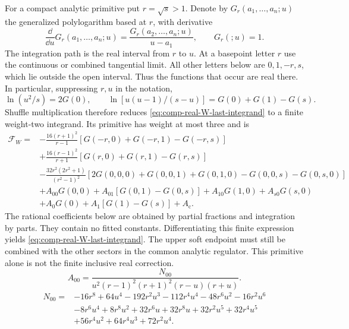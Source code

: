 For a compact analytic primitive put $r=\sqrt{s}>1$. Denote by
$G_r(a_1,\ldots,a_n;u)$ the generalized polylogarithm based at $r$,
with derivative
\begin{equation}
 \frac{\dd}{\dd u}G_r(a_1,\ldots,a_n;u)
 =\frac{G_r(a_2,\ldots,a_n;u)}{u-a_1},\qquad G_r(;u)=1.
\end{equation}
The integration path is the real interval from $r$ to $u$. At a
basepoint letter $r$ use the continuous or combined tangential
limit. All other letters below are $0,1,-r,s$, which lie outside
the open interval. Thus the functions that occur are real there.
In particular, suppressing $r,u$ in the notation,
\begin{equation}
 \ln(u^2/s)=2G(0),\qquad
 \ln[u(u-1)/(s-u)]=G(0)+G(1)-G(s).
\end{equation}
Shuffle multiplication therefore reduces
\eqref{eq:comp-real-W-last-integrand} to a finite weight-two
integrand. Its primitive has weight at most three and is
\begin{align}
 \mathcal F_W={}&-\frac{16(r+1)^2}{r-1}
       [G(-r,0)+G(-r,1)-G(-r,s)]\\
 &+\frac{16(r-1)^2}{r+1}
       [G(r,0)+G(r,1)-G(r,s)]\\
 &-\frac{32r^2(2r^2+1)}{(r^2-1)^2}
       [2G(0,0,0)+G(0,0,1)+G(0,1,0)-G(0,0,s)-G(0,s,0)]\\
 &+A_{00}G(0,0)+A_{01}[G(0,1)-G(0,s)]
        +A_{10}G(1,0)+A_{s0}G(s,0)\\
 &+A_0G(0)+A_1[G(1)-G(s)]+A_{\mathrm c}.
 \label{eq:comp-real-W-GPL-primitive}
\end{align}
The rational coefficients below are obtained by partial fractions
and integration by parts. They contain no fitted constants.
Differentiating this finite expression yields
\eqref{eq:comp-real-W-last-integrand}.
The upper soft endpoint must still be combined with the other
sectors in the common analytic regulator. This primitive alone
is not the finite inclusive real correction.
\begin{equation}
A_{00}=\frac{N_{00}}{u^{2} \left(r - 1\right)^{2} \left(r + 1\right)^{2} \left(r - u\right) \left(r + u\right)}.
\end{equation}
\begin{equation}
\begin{aligned}
N_{00}={}& - 16 r^{8} + 64 u^{4} - 192 r^{2} u^{3} - 112 r^{4} u^{4} - 48 r^{6} u^{2} - 16 r^{2} u^{6}\\
& - 8 r^{6} u^{4} + 8 r^{8} u^{2} + 32 r^{6} u + 32 r^{8} u + 32 r^{2} u^{5} + 32 r^{4} u^{5}\\
& + 56 r^{4} u^{2} + 64 r^{4} u^{3} + 72 r^{2} u^{4}.
\end{aligned}
\end{equation}
